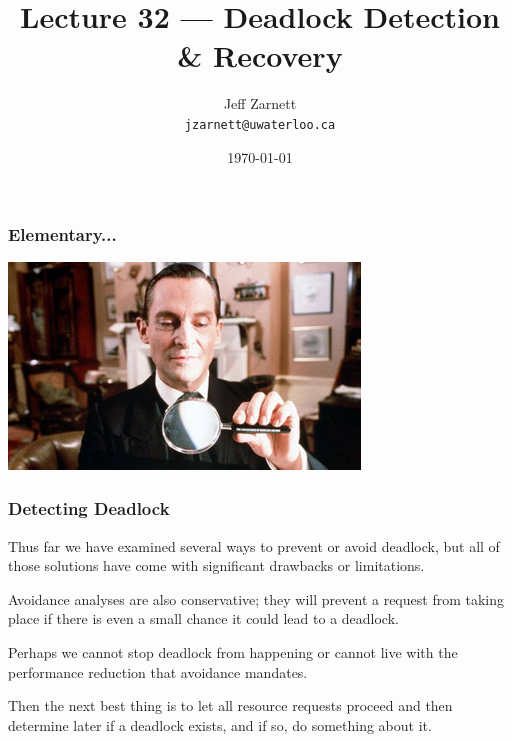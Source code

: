 

\title{Lecture 32 --- Deadlock Detection \& Recovery }

\author{Jeff Zarnett \\ \small \texttt{jzarnett@uwaterloo.ca}}
\date{\today}




\begin{frame}
	\titlepage

\end{frame}


\begin{frame}
	\frametitle{Elementary...}

	\begin{center}
		\includegraphics[width=0.7\textwidth]{images/jeremy-brett.jpg}
	\end{center}

\end{frame}


\begin{frame}
	\frametitle{Detecting Deadlock}

	Thus far we have examined several ways to prevent or avoid deadlock, but all of those solutions have come with significant drawbacks or limitations.

	Avoidance analyses are also conservative; they will prevent a request from taking place if there is even a small chance it could lead to a deadlock.

	Perhaps we cannot stop deadlock from happening or cannot live with the performance reduction that avoidance mandates.

	Then the next best thing is to let all resource requests proceed and then determine later if a deadlock exists, and if so, do something about it.

\end{frame}


